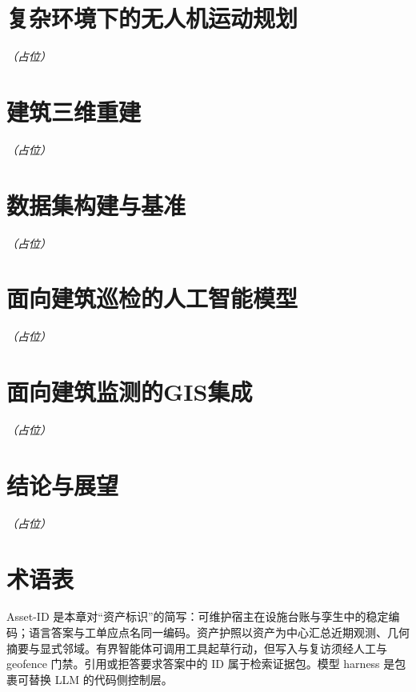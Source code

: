 \documentclass[UTF8,openany,oneside,10pt]{ctexbook}
\begin{document}
\chapter{复杂环境下的无人机运动规划}
\noindent\textit{（占位）}

\chapter{建筑三维重建}
\noindent\textit{（占位）}

\chapter{数据集构建与基准}
\noindent\textit{（占位）}

\chapter{面向建筑巡检的人工智能模型}
\noindent\textit{（占位）}

\chapter{面向建筑监测的GIS集成}
\noindent\textit{（占位）}



\chapter{结论与展望}
\noindent\textit{（占位）}

\backmatter
\chapter*{术语表}
\noindent
Asset-ID 是本章对``资产标识''的简写：可维护宿主在设施台账与孪生中的稳定编码；语言答案与工单应点名同一编码。资产护照以资产为中心汇总近期观测、几何摘要与显式邻域。有界智能体可调用工具起草行动，但写入与复访须经人工与 geofence 门禁。引用或拒答要求答案中的 ID 属于检索证据包。模型 harness 是包裹可替换 LLM 的代码侧控制层。



\end{document}
